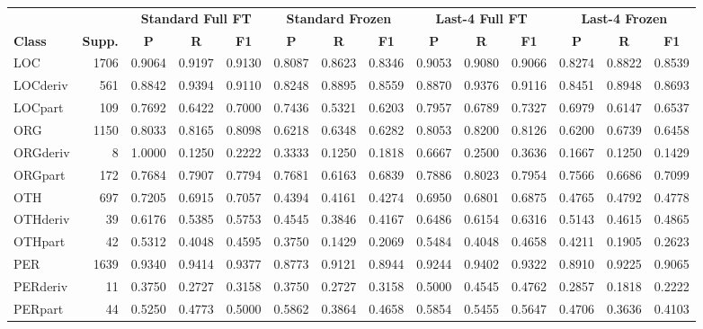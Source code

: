\documentclass[11pt,a4paper,twocolumn]{article}
\begin{document}
\begin{table}[t]
\centering
\scriptsize
\setlength{\tabcolsep}{3.5pt}
\begin{tabular}{l r ccc ccc ccc ccc}
\toprule
& & \multicolumn{3}{c}{\textbf{Standard Full FT}} 
& \multicolumn{3}{c}{\textbf{Standard Frozen}} 
& \multicolumn{3}{c}{\textbf{Last-4 Full FT}} 
& \multicolumn{3}{c}{\textbf{Last-4 Frozen}} \\
\cmidrule(lr){3-5}\cmidrule(lr){6-8}\cmidrule(lr){9-11}\cmidrule(lr){12-14}
\textbf{Class} & \textbf{Supp.} 
& \textbf{P} & \textbf{R} & \textbf{F1}
& \textbf{P} & \textbf{R} & \textbf{F1}
& \textbf{P} & \textbf{R} & \textbf{F1}
& \textbf{P} & \textbf{R} & \textbf{F1} \\
\midrule
LOC      & 1706 & 0.9064 & 0.9197 & 0.9130 & 0.8087 & 0.8623 & 0.8346 & 0.9053 & 0.9080 & 0.9066 & 0.8274 & 0.8822 & 0.8539 \\
LOCderiv &  561 & 0.8842 & 0.9394 & 0.9110 & 0.8248 & 0.8895 & 0.8559 & 0.8870 & 0.9376 & 0.9116 & 0.8451 & 0.8948 & 0.8693 \\
LOCpart  &  109 & 0.7692 & 0.6422 & 0.7000 & 0.7436 & 0.5321 & 0.6203 & 0.7957 & 0.6789 & 0.7327 & 0.6979 & 0.6147 & 0.6537 \\
ORG      & 1150 & 0.8033 & 0.8165 & 0.8098 & 0.6218 & 0.6348 & 0.6282 & 0.8053 & 0.8200 & 0.8126 & 0.6200 & 0.6739 & 0.6458 \\
ORGderiv &    8 & 1.0000 & 0.1250 & 0.2222 & 0.3333 & 0.1250 & 0.1818 & 0.6667 & 0.2500 & 0.3636 & 0.1667 & 0.1250 & 0.1429 \\
ORGpart  &  172 & 0.7684 & 0.7907 & 0.7794 & 0.7681 & 0.6163 & 0.6839 & 0.7886 & 0.8023 & 0.7954 & 0.7566 & 0.6686 & 0.7099 \\
OTH      &  697 & 0.7205 & 0.6915 & 0.7057 & 0.4394 & 0.4161 & 0.4274 & 0.6950 & 0.6801 & 0.6875 & 0.4765 & 0.4792 & 0.4778 \\
OTHderiv &   39 & 0.6176 & 0.5385 & 0.5753 & 0.4545 & 0.3846 & 0.4167 & 0.6486 & 0.6154 & 0.6316 & 0.5143 & 0.4615 & 0.4865 \\
OTHpart  &   42 & 0.5312 & 0.4048 & 0.4595 & 0.3750 & 0.1429 & 0.2069 & 0.5484 & 0.4048 & 0.4658 & 0.4211 & 0.1905 & 0.2623 \\
PER      & 1639 & 0.9340 & 0.9414 & 0.9377 & 0.8773 & 0.9121 & 0.8944 & 0.9244 & 0.9402 & 0.9322 & 0.8910 & 0.9225 & 0.9065 \\
PERderiv &   11 & 0.3750 & 0.2727 & 0.3158 & 0.3750 & 0.2727 & 0.3158 & 0.5000 & 0.4545 & 0.4762 & 0.2857 & 0.1818 & 0.2222 \\
PERpart  &   44 & 0.5250 & 0.4773 & 0.5000 & 0.5862 & 0.3864 & 0.4658 & 0.5854 & 0.5455 & 0.5647 & 0.4706 & 0.3636 & 0.4103 \\

\end{tabular}
\end{table}
\end{document}

